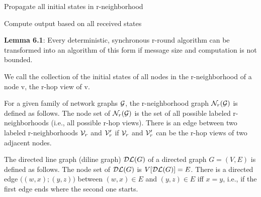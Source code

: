 

{
\begin{items}
    \item Propagate all initial states in r-neighborhood
    \item Compute output based on all received states
    \item {\bf Lemma 6.1}: Every deterministic, synchronous r-round algorithm
    can be transformed into an algorithm of this form if message size and
    computation is not bounded.
\end{items}
}

{
    We call the collection of the initial states of all nodes in the
    r-neighborhood of a node v, the r-hop view of v.
}

{
    For a given family of network graphs $\mathcal{G}$, the r-neighborhood graph
    $\mathcal{N}_r(\mathcal{G})$ is defined as follows. The node set of $\mathcal{N}_r(\mathcal{G})$
    is the set of all possible labeled r-neighborhoods (i.e., all possible r-hop
    views).
    There is an edge between two labeled r-neighborhoods $\mathcal{V}_r$ and
    $\mathcal{V}'_r$ if $\mathcal{V}_r$ and $\mathcal{V}'_r$ can be the r-hop views of two
    adjacent nodes.
}

{
    The directed line graph (diline graph) $\mathcal{DL}(G)$ of a directed graph $G =
    (V, E)$ is defined as follows. The node set of $\mathcal{DL}(G)$ is
    $V[\mathcal{DL}(G)] = E$. There is a directed edge $\big((w, x); (y, z)\big)$
    between $(w, x) \in E$ and $(y, z) \in E$ iff $x = y$, i.e., if the first
    edge ends where the second one starts.
}




